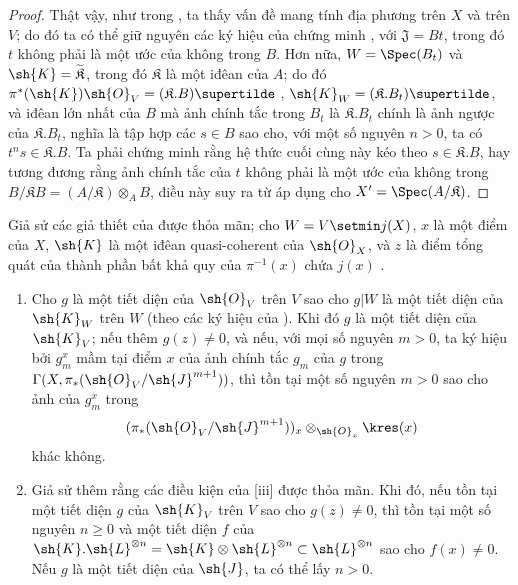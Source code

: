 \documentclass[oneside,10pt]{amsart}
\renewcommand{\geq}{\geqslant}
\newcommand{\oldpage}[2][]{\marginnote{\normalfont\footnotesize\textbf{#1}~|~#2}\ignorespaces}
\let\EGAOriginalLabel\label
\renewcommand{\label}[1]{\phantomsection\EGAOriginalLabel{#1}}
\begin{document}
\begin{proof}
Thật vậy, như trong , ta thấy vấn đề mang tính địa phương trên $X$ và trên $V$;
do đó ta có thể giữ nguyên các ký hiệu của chứng minh , với $\mathfrak{J}=Bt$, trong đó $t$ không phải là một ước của không trong $B$.
Hơn nữa, $W=\Spec(B_t)$ và $\sh{K}=\widetilde{\mathfrak{K}}$, trong đó $\mathfrak{K}$ là một iđêan của $A$;
do đó $\pi^*(\sh{K})\sh{O}_V=(\mathfrak{K}.B)\supertilde$ , $\sh{K}_W=(\mathfrak{K}.B_t)\supertilde$, và iđêan lớn nhất
\oldpage[II]{187}
của $B$ mà ảnh chính tắc trong $B_t$ là $\mathfrak{K}.B_t$ chính là ảnh ngược của $\mathfrak{K}.B_t$, nghĩa là tập hợp các $s\in B$ sao cho, với một số nguyên $n>0$, ta có $t^ns\in\mathfrak{K}.B$.
Ta phải chứng minh rằng hệ thức cuối cùng này kéo theo $s\in\mathfrak{K}.B$, hay tương đương rằng ảnh chính tắc của $t$ không phải là một ước của không trong $B/\mathfrak{K}B=(A/\mathfrak{K})\otimes_A B$, điều này suy ra từ  áp dụng cho $X'=\Spec(A/\mathfrak{K})$.
\end{proof}

\begin{corollary}[8.10.5]
\label{II.8.10.5}
Giả sử các giả thiết của  được thỏa mãn;
cho $W=V\setmin j(X)$, $x$ là một điểm của $X$, $\sh{K}$ là một iđêan quasi-coherent của $\sh{O}_X$, và $z$ là điểm tổng quát của thành phần bất khả quy của $\pi^{-1}(x)$ chứa $j(x)$ .
\begin{enumerate}
    \item[\rm{(i)}] Cho $g$ là một tiết diện của $\sh{O}_V$ trên $V$ sao cho $g|W$ là một tiết diện của $\sh{K}_W$ trên $W$ (theo các ký hiệu của ).
        Khi đó $g$ là một tiết diện của $\sh{K}_V$;
        nếu thêm $g(z)\neq0$, và nếu, với mọi số nguyên $m>0$, ta ký hiệu bởi $g_m^x$ mầm tại điểm $x$ của ảnh chính tắc $g_m$ của $g$ trong $\Gamma(X,\pi_*(\sh{O}_V/\sh{J}^{m+1}))$, thì tồn tại một số nguyên $m>0$ sao cho ảnh của $g_m^x$ trong
        \[
            (\pi_*(\sh{O}_V/\sh{J}^{m+1}))_x \otimes_{\sh{O}_x} \kres(x)
        \]
        khác không.
    \item[\rm{(ii)}] Giả sử thêm rằng các điều kiện của [iii] được thỏa mãn.
        Khi đó, nếu tồn tại một tiết diện $g$ của $\sh{K}_V$ trên $V$ sao cho $g(z)\neq0$, thì tồn tại một số nguyên $n\geq0$ và một tiết diện $f$ của $\sh{K}.\sh{L}^{\otimes n}=\sh{K}\otimes\sh{L}^{\otimes n}\subset\sh{L}^{\otimes n}$ sao cho $f(x)\neq0$.
        Nếu $g$ là một tiết diện của $\sh{J}$, ta có thể lấy $n>0$.
\end{enumerate}
\end{corollary}
\end{document}
